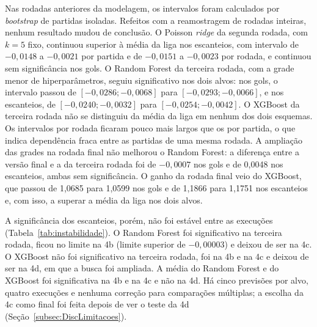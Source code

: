 Nas rodadas anteriores da modelagem, os intervalos foram calculados por \textit{bootstrap} de partidas isoladas. Refeitos com a reamostragem de rodadas inteiras, nenhum resultado mudou de conclusão. O Poisson \textit{ridge} da segunda rodada, com $k = 5$ fixo, continuou superior à média da liga nos escanteios, com intervalo de $-0{,}0148$ a $-0{,}0021$ por partida e de $-0{,}0151$ a $-0{,}0023$ por rodada, e continuou sem significância nos gols. O Random Forest da terceira rodada, com a grade menor de hiperparâmetros, seguiu significativo nos dois alvos: nos gols, o intervalo passou de $[-0{,}0286; -0{,}0068]$ para $[-0{,}0293; -0{,}0066]$, e nos escanteios, de $[-0{,}0240; -0{,}0032]$ para $[-0{,}0254; -0{,}0042]$. O XGBoost da terceira rodada não se distinguiu da média da liga em nenhum dos dois esquemas. Os intervalos por rodada ficaram pouco mais largos que os por partida, o que indica dependência fraca entre as partidas de uma mesma rodada. A ampliação das grades na rodada final não melhorou o Random Forest: a diferença entre a versão final e a da terceira rodada foi de $-0{,}0007$ nos gols e de 0,0048 nos escanteios, ambas sem significância. O ganho da rodada final veio do XGBoost, que passou de 1,0685 para 1,0599 nos gols e de 1,1866 para 1,1751 nos escanteios e, com isso, a superar a média da liga nos dois alvos.

A significância dos escanteios, porém, não foi estável entre as execuções (Tabela~\ref{tab:instabilidade}). O Random Forest foi significativo na terceira rodada, ficou no limite na 4b (limite superior de $-0{,}00003$) e deixou de ser na 4c. O XGBoost não foi significativo na terceira rodada, foi na 4b e na 4c e deixou de ser na 4d, em que a busca foi ampliada. A média do Random Forest e do XGBoost foi significativa na 4b e na 4c e não na 4d. Há cinco previsões por alvo, quatro execuções e nenhuma correção para comparações múltiplas; a escolha da 4c como final foi feita depois de ver o teste da 4d (Seção~\ref{subsec:DiscLimitacoes}).

